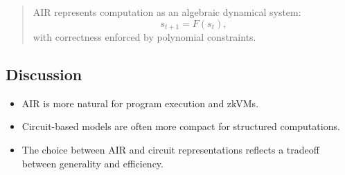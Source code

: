 \begin{quote}
AIR represents computation as an algebraic dynamical system:
\[
s_{t+1} = F(s_t),
\]
with correctness enforced by polynomial constraints.
\end{quote}

\subsection{Discussion}

\begin{itemize}
\item AIR is more natural for program execution and zkVMs.
\item Circuit-based models are often more compact for structured computations.
\item The choice between AIR and circuit representations reflects a tradeoff between generality and efficiency.
\end{itemize}